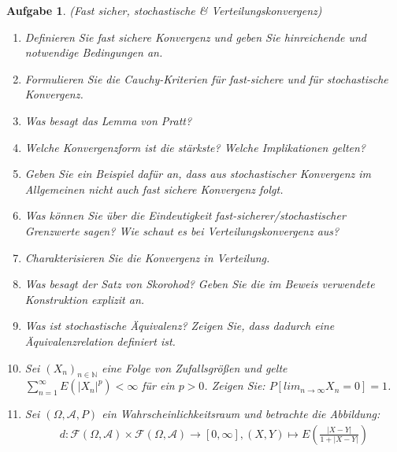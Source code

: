 \documentclass[11pt, a4paper, ngerman]{article}
\newcommand{\N}{\mathbb{N}}
\newtheorem{aufgabe}{Aufgabe}
\begin{document}
\begin{aufgabe} (Fast sicher, stochastische \& Verteilungskonvergenz)
    \begin{enumerate}
        \item 
        Definieren Sie fast sichere Konvergenz und geben Sie hinreichende und notwendige Bedingungen an. 
        \item 
        Formulieren Sie die Cauchy-Kriterien für fast-sichere und für stochastische Konvergenz. 
        \item
        Was besagt das Lemma von Pratt? 
        \item 
        Welche Konvergenzform ist die stärkste? Welche Implikationen gelten?  
        \item 
        Geben Sie ein Beispiel dafür an, dass aus stochastischer Konvergenz im Allgemeinen nicht auch fast sichere Konvergenz folgt. 
        \item 
        Was können Sie über die Eindeutigkeit fast-sicherer/stochastischer Grenzwerte sagen? Wie schaut es bei Verteilungskonvergenz aus?
        \item
        Charakterisieren Sie die Konvergenz in Verteilung. 
        \item 
        Was besagt der Satz von Skorohod? Geben Sie die im Beweis verwendete Konstruktion explizit an. 
        \item 
        Was ist stochastische Äquivalenz? Zeigen Sie, dass dadurch eine Äquivalenzrelation definiert ist. 
        \item 
        Sei $(X_n)_{n \in \N}$ eine Folge von Zufallsgrößen und gelte $\sum_{n=1}^{\infty}E(\lvert X_n\rvert^p) < \infty$ für ein $p > 0$. Zeigen Sie: $P[lim_{n \to \infty} X_n = 0] = 1$. 
        \item 
        Sei $(\Omega, \mathcal{A}, P)$ ein Wahrscheinlichkeitsraum und betrachte die Abbildung:
        \begin{align*}
            d : \mathcal{F}(\Omega, \mathcal{A}) \times \mathcal{F}(\Omega, \mathcal{A}) \to [0, \infty], (X,Y) \mapsto E(\frac{\lvert X - Y \rvert}{1 + \lvert X - Y \rvert})
        \end{align*}

    \end{enumerate}
\end{aufgabe}
\end{document}
